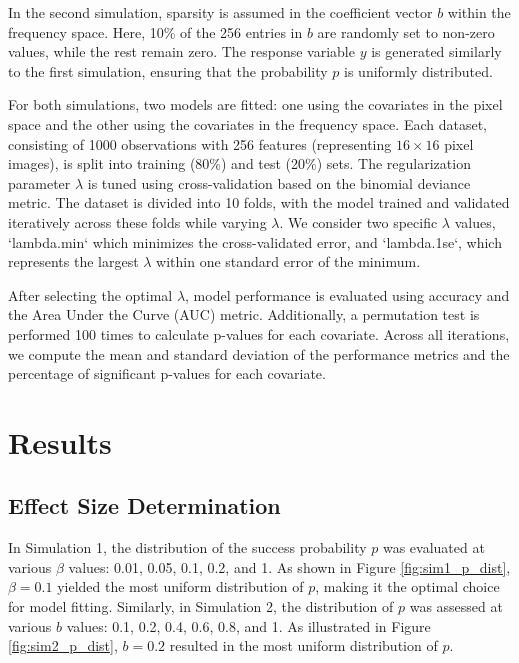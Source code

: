 \documentclass[12pt]{article}
\begin{document}
In the second simulation, sparsity is assumed in the coefficient vector \( b \) within the frequency space. Here, 10\%
of the 256 entries in \( b \) are randomly set to non-zero values, while the rest remain zero. The response variable \(
y \) is generated similarly to the first simulation, ensuring that the probability \( p \) is uniformly distributed.

For both simulations, two models are fitted: one using the covariates in the pixel space and the other using the
covariates in the frequency space. Each dataset, consisting of 1000 observations with 256 features (representing \( 16
\times 16 \) pixel images), is split into training (80\%) and test (20\%) sets. The regularization parameter \( \lambda
\) is tuned using cross-validation based on the binomial deviance metric. The dataset is divided into 10 folds, with the
model trained and validated iteratively across these folds while varying \( \lambda \). We consider two specific \(
\lambda \) values, `lambda.min` which minimizes the cross-validated error, and `lambda.1se`, which represents the
largest \( \lambda \) within one standard error of the minimum.

After selecting the optimal \( \lambda \), model performance is evaluated using accuracy and the Area Under the Curve (AUC) metric. Additionally, a permutation test is performed 100 times to calculate p-values for each covariate. Across all iterations, we compute the mean and standard deviation of the performance metrics and the percentage of significant p-values for each covariate.


\section*{Results}

\subsection*{Effect Size Determination}

In Simulation 1, the distribution of the success probability \( p \) was evaluated at various \( \beta \) values: 0.01,
0.05, 0.1, 0.2, and 1. As shown in Figure \ref{fig:sim1_p_dist}, \( \beta = 0.1 \) yielded the most uniform distribution
of \( p \), making it the optimal choice for model fitting. Similarly, in Simulation 2, the distribution of \( p \) was assessed at various \( b \) values: 0.1, 0.2, 0.4, 0.6, 0.8, and 1. As illustrated in Figure \ref{fig:sim2_p_dist}, \( b = 0.2 \) resulted in the most uniform distribution of \( p \).
\end{document}
